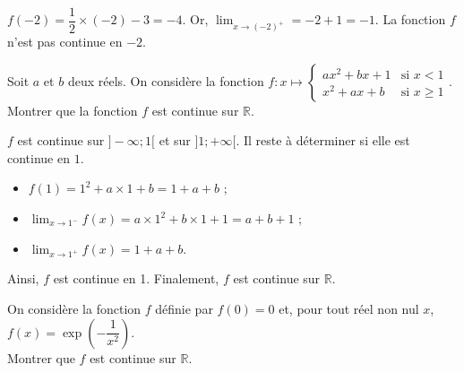 \documentclass[11pt,fleqn, openany]{book} %
\begin{document}
\begin{solution}$f(-2)=\dfrac{1}{2}\times(-2)-3=-4$. Or, $\displaystyle\lim_{x \to (-2)^+}=-2+1=-1$. La fonction $f$ n'est pas continue en $-2$.


\begin{center}


\end{center}
\end{solution}




\begin{exercise}
Soit $a$ et $b$ deux réels. On considère la fonction \renewcommand{\arraystretch}{1}$f:x\mapsto \left\{ \begin{array}{ll} ax^2+bx+1 & \text{si } x<1 \\ x^2+ax+b & \text{si } x\geqslant 1 \end{array}\right.$.\\
Montrer que la fonction $f$ est continue sur $\mathbb{R}$.\end{exercise}
\begin{solution}
 $f$ est continue sur $]-\infty;1[$ et sur $]1;+\infty[$. Il reste à déterminer si elle est continue en $1$.
 \begin{itemize}
 \item $f(1)=1^2+a \times 1+b=1+a+b$ ;
 \item $\displaystyle\lim_{x \to 1^-} f(x)= a \times 1^2 + b \times 1 + 1 = a +b+1$ ;
 \item $\displaystyle\lim_{x \to 1^+} f(x)=1+a+b$.
 \end{itemize}
 Ainsi, $f$ est continue en 1. Finalement, $f$ est continue sur $\mathbb{R}$.\end{solution}
 
 


\begin{exercise}On considère la fonction $f$ définie par $f(0)=0$ et, pour tout réel non nul $x$, $f(x)=\exp\left(-\dfrac{1}{x^2}\right)$. \\ Montrer que $f$ est continue sur $\mathbb{R}$.\end{exercise}
\end{document}
